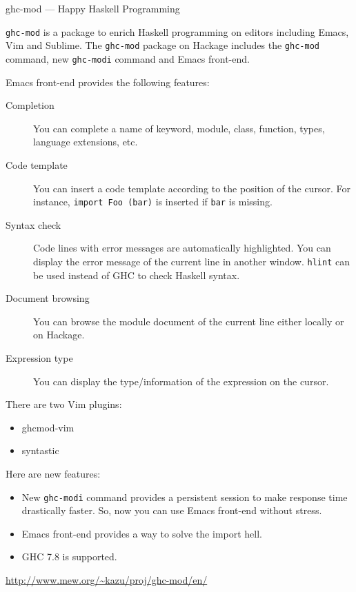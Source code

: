 \begin{hcarentry}[updated]{ghc-mod --- Happy Haskell Programming}
\makeheader

{\tt ghc-mod} is a package to enrich Haskell programming on editors including Emacs, Vim and Sublime. The {\tt ghc-mod} package on Hackage includes the {\tt ghc-mod} command, new {\tt ghc-modi} command and Emacs front-end. 

Emacs front-end provides the following features:

\begin{description}
\item[Completion] You can complete a name of keyword, module, class, function, types, language extensions, etc.

\item[Code template] You can insert a code template according to the position of the cursor. For instance, {\tt import Foo (bar)} is inserted if {\tt bar} is missing.

\item[Syntax check] Code lines with error messages are automatically highlighted. You can display the error message of the current line in another window. {\tt hlint} %
can be used instead of GHC to check Haskell syntax. 

\item[Document browsing] You can browse the module document of the current line either locally or on Hackage.

\item[Expression type] You can display the type/information of the expression on the cursor. 
\end{description}

\noindent
There are two Vim plugins:
\begin{itemize}
\item ghcmod-vim
\item syntastic
\end{itemize}

\noindent
Here are new features:
\begin{itemize}
\item New {\tt ghc-modi} command provides a persistent session to make response time drastically faster. So, now you can use Emacs front-end without stress.
\item Emacs front-end provides a way to solve the import hell.
\item GHC 7.8 is supported.
\end{itemize}

\FurtherReading
  \url{http://www.mew.org/~kazu/proj/ghc-mod/en/}
\end{hcarentry}
